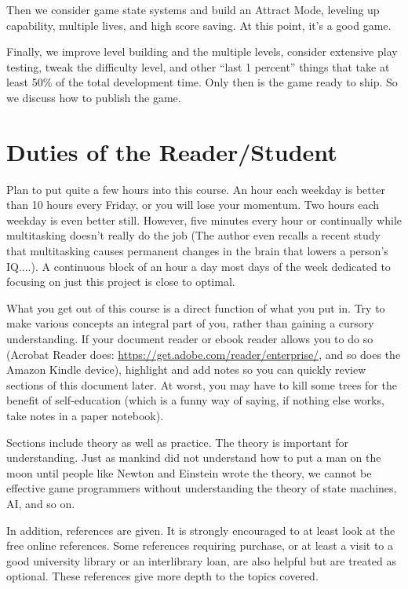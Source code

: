 \documentclass[12pt]{amsbook}
\theoremstyle{definition}
\theoremstyle{remark}
\numberwithin{figure}{chapter}
\numberwithin{table}{chapter}
\numberwithin{section}{chapter}
\numberwithin{equation}{section}
\begin{document}
Then we consider game state systems and build an Attract Mode, leveling up capability, multiple lives, and high score saving.  At this point, it’s a good game.

Finally, we improve level building and the multiple levels, consider extensive play testing, tweak the difficulty level, and other “last 1 percent” things that take at least 50\% of the total development time.  Only then is the game ready to ship.  So we discuss how to publish the game.

\section{Duties of the Reader/Student}

Plan to put quite a few hours into this course.  An hour each weekday is better than 10 hours every Friday, or you will lose your momentum.  Two hours each weekday is even better still.   However, five minutes every hour or continually while multitasking doesn't really do the job (The author even recalls a recent study that multitasking causes permanent changes in the brain that lowers a person's IQ....).  A continuous block of an hour a day most days of the week dedicated to focusing on just this project is close to optimal.  

What you get out of this course is a direct function of what you put in.  Try to make various concepts an integral part of you, rather than gaining a cursory understanding.  If your document reader or ebook reader allows you to do so (Acrobat Reader does: \url{https://get.adobe.com/reader/enterprise/}, and so does the Amazon Kindle device), highlight and add notes so you can quickly review sections of this document later.  At worst, you may have to kill some trees for the benefit of self-education (which is a funny way of saying, if nothing else works, take notes in a paper notebook).

Sections include theory as well as practice.  The theory is important for understanding.  Just as mankind did not understand how to put a man on the moon until people like Newton and Einstein wrote the theory, we cannot be effective game programmers without understanding the theory of state machines, AI, and so on.

In addition, references are given.  It is strongly encouraged to at least look at the free online references.  Some references requiring purchase, or at least a visit to a good university library or an interlibrary loan, are also helpful but are treated as optional.  These references give more depth to the topics covered.
\end{document}
